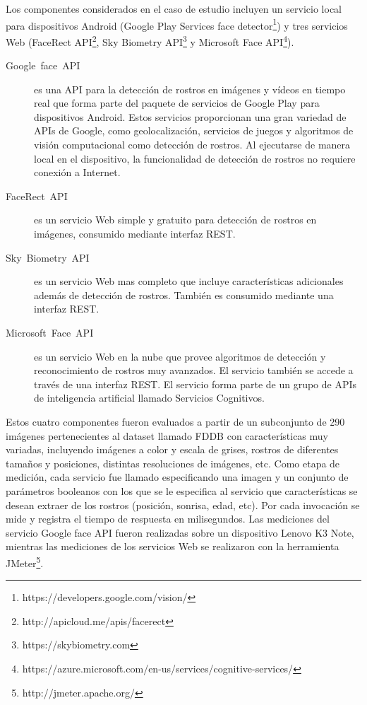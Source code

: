 Los componentes considerados en el caso de estudio incluyen un servicio
local para dispositivos Android (Google Play Services face detector\footnote{https://developers.google.com/vision/})
y tres servicios Web (FaceRect API\footnote{http://apicloud.me/apis/facerect},
Sky Biometry API\footnote{https://skybiometry.com} y Microsoft Face
API\footnote{https://azure.microsoft.com/en-us/services/cognitive-services/}). 
\begin{description}
\item [{Google~face~API}] es una API para la detección de rostros en
imágenes y vídeos en tiempo real que forma parte del paquete de servicios
de Google Play para dispositivos Android. Estos servicios proporcionan
una gran variedad de APIs de Google, como geolocalización, servicios
de juegos y algoritmos de visión computacional como detección de rostros.
Al ejecutarse de manera local en el dispositivo, la funcionalidad
de detección de rostros no requiere conexión a Internet.
\item [{FaceRect~API}] es un servicio Web simple y gratuito para detección
de rostros en imágenes, consumido mediante interfaz \ac{REST}. 
\item [{Sky~Biometry~API}] es un servicio Web mas completo que incluye
características adicionales además de detección de rostros. También
es consumido mediante una interfaz \ac{REST}.
\item [{Microsoft~Face~API}] es un servicio Web en la nube que provee
algoritmos de detección y reconocimiento de rostros muy avanzados.
El servicio también se accede a través de una interfaz \ac{REST}.
El servicio forma parte de un grupo de APIs de inteligencia artificial
llamado Servicios Cognitivos.
\end{description}
Estos cuatro componentes fueron evaluados a partir de un subconjunto
de 290 imágenes pertenecientes al dataset llamado FDDB\citep{fddbTechReport}
con características muy variadas, incluyendo imágenes a color y escala
de grises, rostros de diferentes tamaños y posiciones, distintas resoluciones
de imágenes, etc. Como etapa de medición, cada servicio fue llamado
especificando una imagen y un conjunto de parámetros booleanos con
los que se le especifica al servicio que características se desean
extraer de los rostros (posición, sonrisa, edad, etc). Por cada invocación
se mide y registra el tiempo de respuesta en milisegundos. Las mediciones
del servicio Google face API fueron realizadas sobre un dispositivo
Lenovo K3 Note, mientras las mediciones de los servicios Web se realizaron
con la herramienta JMeter\footnote{http://jmeter.apache.org/}.

